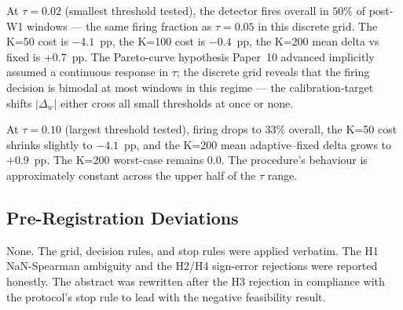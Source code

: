 At $\tau = 0.02$ (smallest threshold tested), the detector fires
overall in $50\%$ of post-W1 windows --- the same firing fraction as
$\tau = 0.05$ in this discrete grid. The K=50 cost is
$-4.1$~pp, the K=100 cost is $-0.4$~pp, the K=200 mean delta vs
fixed is $+0.7$~pp. The Pareto-curve hypothesis Paper~10 advanced
implicitly assumed a continuous response in $\tau$; the discrete
grid reveals that the firing decision is bimodal at most windows
in this regime --- the calibration-target shifts $|\Delta_w|$
either cross all small thresholds at once or none.

At $\tau = 0.10$ (largest threshold tested), firing drops to $33\%$
overall, the K=50 cost shrinks slightly to $-4.1$~pp, and the K=200
mean adaptive--fixed delta grows to $+0.9$~pp. The K=200 worst-case
remains $0.0$. The procedure's behaviour is approximately constant
across the upper half of the $\tau$ range.

\subsection{Pre-Registration Deviations}

None. The grid, decision rules, and stop rules were applied verbatim.
The H1 NaN-Spearman ambiguity and the H2/H4 sign-error rejections
were reported honestly. The abstract was rewritten after the H3
rejection in compliance with the protocol's stop rule to lead with
the negative feasibility result.

